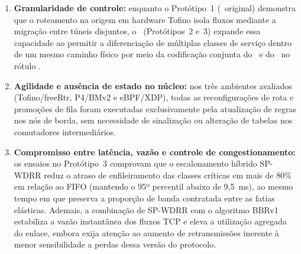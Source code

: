 \begin{enumerate}
    \item \textbf{Granularidade de controle:} enquanto o Protótipo~1 (\polka\ original) demonstra que o roteamento na origem em hardware Tofino isola fluxos mediante a migração entre túneis disjuntos, o \nome\ (Protótipos~2 e~3) expande essa capacidade ao permitir a diferenciação de múltiplas classes de serviço dentro de um mesmo caminho físico por meio da codificação conjunta do \portID\ e do \qID\ no rótulo \routeID.
    \item \textbf{Agilidade e ausência de estado no núcleo:} nos três ambientes avaliados (Tofino/freeRtr, P4/BMv2 e eBPF/XDP), todas as reconfigurações de rota e promoções de fila foram executadas exclusivamente pela atualização de regras nos nós de borda, sem necessidade de sinalização ou alteração de tabelas nos comutadores intermediários.
    \item \textbf{Compromisso entre latência, vazão e controle de congestionamento:} os ensaios no Protótipo~3 comprovam que o escalonamento híbrido SP-WDRR reduz o atraso de enfileiramento das classes críticas em mais de 80\% em relação ao FIFO (mantendo o 95º percentil abaixo de 9,5~ms), ao mesmo tempo em que preserva a proporção de banda contratada entre as fatias elásticas. Ademais, a combinação de SP-WDRR com o algoritmo BBRv1 estabiliza a vazão instantânea dos fluxos TCP e eleva a utilização agregada do enlace, embora exija atenção ao aumento de retransmissões inerente à menor sensibilidade a perdas dessa versão do protocolo.
\end{enumerate}